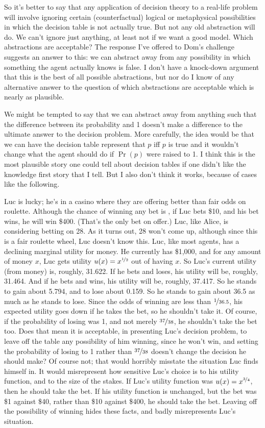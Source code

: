 So it's better to say that any application of decision theory to a real-life problem will involve ignoring certain (counterfactual) logical or metaphysical possibilities in which the decision table is not actually true. But not any old abstraction will do. We can't ignore just anything, at least not if we want a good model. Which abstractions are acceptable? The response I've offered to Dom's challenge suggests an answer to this: we can abstract away from any possibility in which something the agent actually knows is false. I don't have a knock-down argument that this is the best of all possible abstractions, but nor do I know of any alternative answer to the question of which abstractions are acceptable which is nearly as plausible.

We might be tempted to say that we can abstract away from anything such that the difference between its probability and 1 doesn't make a difference to the ultimate answer to the decision problem. More carefully, the idea would be that we can have the decision table represent that $p$ iff $p$ is true and it wouldn't change what the agent should do if $\Pr(p)$ were raised to 1. I think this is the most plausible story one could tell about decision tables if one didn't like the knowledge first story that I tell. But I also don't think it works, because of cases like the following.

Luc is lucky; he's in a casino where they are offering better than fair odds on roulette. Although the chance of winning any bet is , if Luc bets \$10, and his bet wins, he will win \$400. (That's the only bet on offer.) Luc, like Alice, is considering betting on 28. As it turns out, 28 won't come up, although since this is a fair roulette wheel, Luc doesn't know this. Luc, like most agents, has a declining marginal utility for money. He currently has \$1,000, and for any amount of money $x$, Luc gets utility $u(x) = x^{\nicefrac{1}{2}}$ out of having $x$. So Luc's current utility (from money) is, roughly, 31.622. If he bets and loses, his utility will be, roughly, 31.464. And if he bets and wins, his utility will be, roughly, 37.417. So he stands to gain about 5.794, and to lose about 0.159. So he stands to gain about 36.5 as much as he stands to lose. Since the odds of winning are less than $\nicefrac{1}{36.5}$, his expected utility goes down if he takes the bet, so he shouldn't take it. Of course, if the probability of losing was 1, and not merely $\nicefrac{37}{38}$, he shouldn't take the bet too. Does that mean it is acceptable, in presenting Luc's decision problem, to leave off the table any possibility of him winning, since he won't win, and setting the probability of losing to 1 rather than $\nicefrac{37}{38}$ doesn't change the decision he should make? Of course not; that would horribly misstate the situation Luc finds himself in. It would misrepresent  how sensitive Luc's choice is to his utility function, and to the size of the stakes. If Luc's utility function was $u(x) = x^{\nicefrac{3}{4}}$, then he should take the bet. If his utility function is unchanged, but the bet was \$1 against \$40, rather than \$10 against \$400, he should take the bet. Leaving off the possibility of winning hides these facts, and badly misrepresents Luc's situation.

